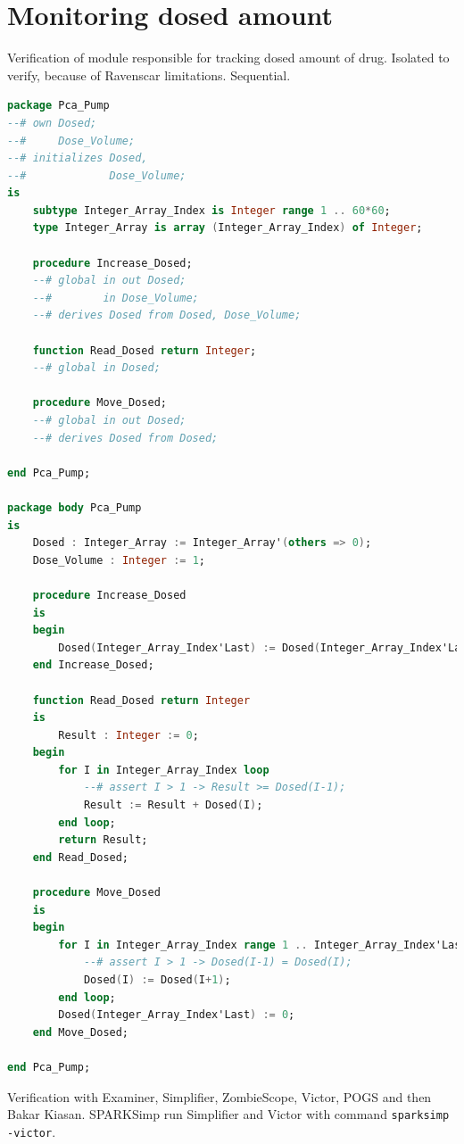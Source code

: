 \section{Monitoring dosed amount}
\label{verification:pcapump:monitoring}

Verification of module responsible for tracking dosed amount of drug.
Isolated to verify, because of Ravenscar limitations.
Sequential.

\singlespacing
\begin{lstlisting}[language=ada, frame=single, gobble=0, caption={Dose monitor module specification}]
package Pca_Pump
--# own Dosed;
--#     Dose_Volume;
--# initializes Dosed,
--#             Dose_Volume;
is
    subtype Integer_Array_Index is Integer range 1 .. 60*60;
    type Integer_Array is array (Integer_Array_Index) of Integer;

    procedure Increase_Dosed;
    --# global in out Dosed;
    --#        in Dose_Volume;
    --# derives Dosed from Dosed, Dose_Volume;

    function Read_Dosed return Integer;
    --# global in Dosed;

    procedure Move_Dosed;
    --# global in out Dosed;
    --# derives Dosed from Dosed;

end Pca_Pump;

package body Pca_Pump
is
    Dosed : Integer_Array := Integer_Array'(others => 0);
    Dose_Volume : Integer := 1;

    procedure Increase_Dosed
    is
    begin
        Dosed(Integer_Array_Index'Last) := Dosed(Integer_Array_Index'Last) + Dose_Volume;
    end Increase_Dosed;

    function Read_Dosed return Integer
    is
        Result : Integer := 0;
    begin
        for I in Integer_Array_Index loop
            --# assert I > 1 -> Result >= Dosed(I-1);
            Result := Result + Dosed(I);
        end loop;
        return Result;
    end Read_Dosed;

    procedure Move_Dosed
    is
    begin
        for I in Integer_Array_Index range 1 .. Integer_Array_Index'Last-1 loop
            --# assert I > 1 -> Dosed(I-1) = Dosed(I);
            Dosed(I) := Dosed(I+1);
        end loop;
        Dosed(Integer_Array_Index'Last) := 0;
    end Move_Dosed;

end Pca_Pump;
\end{lstlisting}
\label{listing:pcapump_dosemonitor}
\doublespacing

Verification with Examiner, Simplifier, ZombieScope, Victor, POGS and then Bakar Kiasan.
SPARKSimp run Simplifier and Victor with command \lstinline{sparksimp -victor}.

